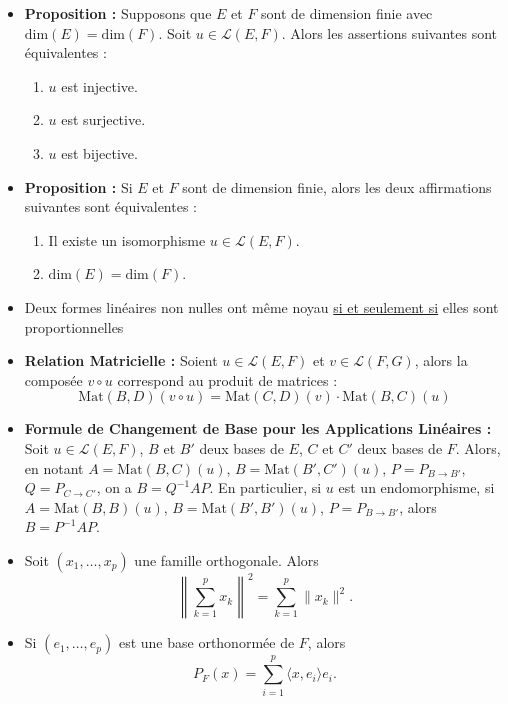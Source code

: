 \documentclass{article}
\begin{document}
\begin{itemize}[label=$\ast$]
\item \textbf{Proposition :} Supposons que \(E\) et \(F\) sont de dimension finie avec \(\text{dim}(E) = \text{dim}(F)\). Soit \(u \in \mathcal{L}(E, F)\). Alors les assertions suivantes sont équivalentes :

\begin{enumerate}
  \item \(u\) est injective.
  \item \(u\) est surjective.
  \item \(u\) est bijective.
\end{enumerate}

\item \textbf{Proposition :} Si \(E\) et \(F\) sont de dimension finie, alors les deux affirmations suivantes sont équivalentes :
\begin{enumerate}
  \item Il existe un isomorphisme \(u \in \mathcal{L}(E, F)\).
  \item \(\text{dim}(E) = \text{dim}(F)\).
\end{enumerate}

\item Deux formes linéaires non nulles ont même noyau \underline{si et seulement si} elles sont proportionnelles

\item \textbf{Relation Matricielle :} Soient \(u \in \mathcal{L}(E, F)\) et \(v \in \mathcal{L}(F, G)\), alors la composée \(v \circ u\) correspond au produit de matrices : \[ \text{Mat}(B, D)(v \circ u) = \text{Mat}(C, D)(v) \cdot \text{Mat}(B, C)(u) \] 

\item \textbf{Formule de Changement de Base pour les Applications Linéaires :} Soit \(u \in \mathcal{L}(E, F)\), \(B\) et \(B'\) deux bases de \(E\), \(C\) et \(C'\) deux bases de \(F\). Alors, en notant \(A = \text{Mat}(B, C)(u)\), \(B = \text{Mat}(B', C')(u)\), \(P = P_{B \to B'}\), \(Q = P_{C \to C'}\), on a \(B = Q^{-1} A P\). En particulier, si \(u\) est un endomorphisme, si \(A = \text{Mat}(B, B)(u)\), \(B = \text{Mat}(B', B')(u)\), \(P = P_{B \to B'}\), alors \(B = P^{-1} A P\).

\item Soit $(x_1, \ldots, x_p)$ une famille orthogonale. Alors  \[ \left\|\sum_{k=1}^{p} x_k \right\|^2 = \sum_{k=1}^{p} \|x_k\|^2. \]

\item Si $(e_1, \ldots, e_p)$ est une base orthonormée de $F$, alors  \[ P_F(x) = \sum_{i=1}^{p} \langle x, e_i \rangle e_i. \]


\end{itemize}
\end{document}
